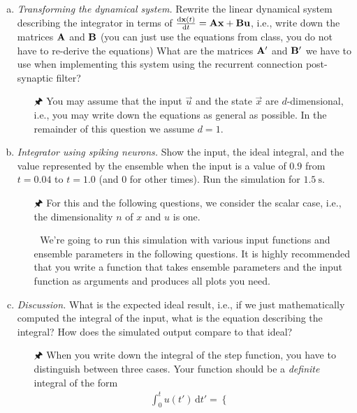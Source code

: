 	\begin{enumerate}[a)]
		\item {} \emph{Transforming the dynamical system.} Rewrite the linear dynamical system describing the integrator in terms of $\frac{\mathrm{d}{\mathbf{x}}(t)}{\mathrm{d}t} = {\mathbf{A}} {\mathbf{x}} + {\mathbf{B}} {\mathbf{u}}$, i.e., write down the matrices ${\mathbf{A}}$ and ${\mathbf{B}}$ (you can just use the equations from class, you do not have to re-derive the equations) What are the matrices ${\mathbf{A}}'$ and ${\mathbf{B}}'$ we have to use when implementing this system using the recurrent connection post-synaptic filter?
		\begin{itemize}
			\item[{\symbolfont 🖈}] You may assume that the input $\vec u$ and the state $\vec x$ are $d$-dimensional, i.e., you may write down the equations as general as possible. In the remainder of this question we assume $d = 1$.
		\end{itemize}
		\item {} \emph{Integrator using spiking neurons.} Show the input, the ideal integral, and the value represented by the ensemble when the input is a value of $0.9$ from $t=0.04$ to $t=1.0$ (and $0$ for other times). Run the simulation for $\SI{1.5}{\second}$.
		\begin{itemize}
			\item[{\symbolfont 🖈}] For this and the following questions, we consider the scalar case, i.e., the dimensionality $n$ of $x$ and $u$ is one.
			\item[{\symbolfont 🐍}] We're going to run this simulation with various input functions and ensemble parameters in the following questions. It is highly recommended that you write a function that takes ensemble parameters and the input function as arguments and produces all plots you need.
		\end{itemize}
		\item {} \emph{Discussion.} What is the expected ideal result, i.e., if we just mathematically computed the integral of the input, what is the equation describing the integral? How does the simulated output compare to that ideal?
		\begin{itemize}
			\item[{\symbolfont 🖈}] When you write down the integral of the step function, you have to distinguish between three cases. Your function should be a \emph{definite} integral of the form
			\begin{align*}
				\int_{0}^{t} u(t') \,\mathrm{d}{t'} = \begin{cases}

\end{cases}
\end{align*}
\end{itemize}
\end{enumerate}
